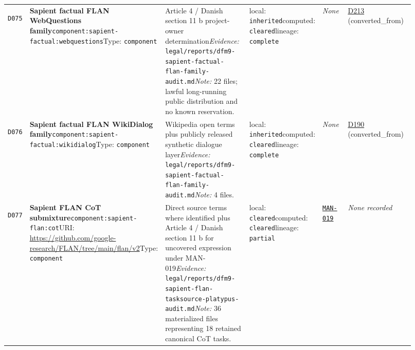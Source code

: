 \documentclass[9pt,a4paper]{article}
\newcommand{\depid}[1]{\hypertarget{dep:#1}{\texttt{#1}}}
\begin{document}
\begin{landscape}
\begin{longtable}{@{}L{0.035\linewidth}L{0.185\linewidth}L{0.27\linewidth}L{0.09\linewidth}L{0.10\linewidth}L{0.24\linewidth}@{}}
\depid{D075} & \textbf{Sapient factual FLAN WebQuestions family}\newline \nolinkurl{component:sapient-factual:webquestions}\newline Type: \texttt{component} & Article 4 / Danish section 11 b project-owner determination\newline \textit{Evidence:} \nolinkurl{legal/reports/dfm9-sapient-factual-flan-family-audit.md}\newline \textit{Note:} 22 files; lawful long-running public distribution and no known reservation. & local: \texttt{inherited}\newline computed: \texttt{cleared}\newline lineage: \texttt{complete} & \textit{None} & \hyperlink{dep:D213}{D213} (converted\_from) \\
\depid{D076} & \textbf{Sapient factual FLAN WikiDialog family}\newline \nolinkurl{component:sapient-factual:wikidialog}\newline Type: \texttt{component} & Wikipedia open terms plus publicly released synthetic dialogue layer\newline \textit{Evidence:} \nolinkurl{legal/reports/dfm9-sapient-factual-flan-family-audit.md}\newline \textit{Note:} 4 files. & local: \texttt{inherited}\newline computed: \texttt{cleared}\newline lineage: \texttt{complete} & \textit{None} & \hyperlink{dep:D190}{D190} (converted\_from) \\
\depid{D077} & \textbf{Sapient FLAN CoT submixture}\newline \nolinkurl{component:sapient-flan:cot}\newline URI: \url{https://github.com/google-research/FLAN/tree/main/flan/v2}\newline Type: \texttt{component} & Direct source terms where identified plus Article 4 / Danish section 11 b for uncovered expression under MAN-019\newline \textit{Evidence:} \nolinkurl{legal/reports/dfm9-sapient-flan-tasksource-platypus-audit.md}\newline \textit{Note:} 36 materialized files representing 18 retained canonical CoT tasks. & local: \texttt{cleared}\newline computed: \texttt{cleared}\newline lineage: \texttt{partial} & \hyperlink{manual:MAN-019}{\texttt{MAN-019}} & \textit{None recorded} \\

\end{longtable}
\end{landscape}
\end{document}
